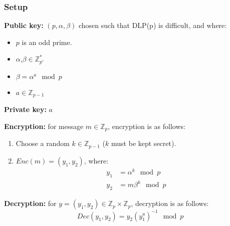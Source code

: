 
\subsubsection*{Setup}
\textbf{Public key:} $(p,\alpha,\beta)$ chosen such that DLP(p) is
difficult, and where:
\begin{itemize}
\item $p$ is an odd prime.
\item $\alpha$,$\beta \in \mathbb{Z}_{p'}^*$
\item $\beta = \alpha^a \mod p$
\item $a \in \mathbb{Z}_{p-1} $
\end{itemize}

\textbf{Private key:} $a$

\textbf{Encryption:} for message $m \in \mathbb{Z}_p$, encryption is
as follows:
\begin{enumerate}
\item Choose a random $k \in \mathbb{Z}_{p-1}$ ($k$ must be kept secret).
\item $Enc(m) = (y_1,y_2)$, where:
  \begin{align*}
    y_1 &= \alpha^k \mod p\\
    y_2 &= m\beta^k \mod p
  \end{align*}
\end{enumerate}

\textbf{Decryption:} for $y = (y_1,y_2) \in \mathbb{Z}_p \times
\mathbb{Z}_p$, decryption is as follows:
\[ Dec(y_1,y_2) = y_2(y_1^a)^{-1} \mod p \]
